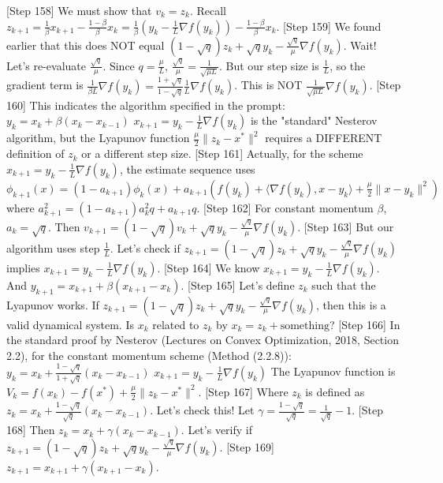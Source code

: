 \documentclass{article}
\begin{document}
[Step 158] We must show that $v_k = z_k$.
Recall $z_{k+1} = \frac{1}{\beta}x_{k+1} - \frac{1-\beta}{\beta}x_k = \frac{1}{\beta}(y_k - \frac{1}{L}\nabla f(y_k)) - \frac{1-\beta}{\beta}x_k$.
[Step 159] We found earlier that this does NOT equal $(1-\sqrt{q})z_k + \sqrt{q}y_k - \frac{\sqrt{q}}{\mu}\nabla f(y_k)$.
Wait! Let's re-evaluate $\frac{\sqrt{q}}{\mu}$. Since $q = \frac{\mu}{L}$, $\frac{\sqrt{q}}{\mu} = \frac{1}{\sqrt{\mu L}}$.
But our step size is $\frac{1}{L}$, so the gradient term is $\frac{1}{\beta L}\nabla f(y_k) = \frac{1+\sqrt{q}}{1-\sqrt{q}} \frac{1}{L} \nabla f(y_k)$.
This is NOT $\frac{1}{\sqrt{\mu L}}\nabla f(y_k)$.
[Step 160] This indicates the algorithm specified in the prompt:
$y_k = x_k + \beta(x_k - x_{k-1})$
$x_{k+1} = y_k - \frac{1}{L}\nabla f(y_k)$
is the "standard" Nesterov algorithm, but the Lyapunov function $\frac{\mu}{2}\|z_k - x^*\|^2$ requires a DIFFERENT definition of $z_k$ or a different step size.
[Step 161] Actually, for the scheme $x_{k+1} = y_k - \frac{1}{L}\nabla f(y_k)$, the estimate sequence uses $\phi_{k+1}(x) = (1-a_{k+1})\phi_k(x) + a_{k+1}(f(y_k) + \langle \nabla f(y_k), x - y_k \rangle + \frac{\mu}{2}\|x - y_k\|^2)$ where $a_{k+1}^2 = (1-a_{k+1})a_k^2 q + a_{k+1} q$.
[Step 162] For constant momentum $\beta$, $a_k = \sqrt{q}$.
Then $v_{k+1} = (1-\sqrt{q})v_k + \sqrt{q}y_k - \frac{\sqrt{q}}{\mu}\nabla f(y_k)$.
[Step 163] But our algorithm uses step $\frac{1}{L}$.
Let's check if $z_{k+1} = (1-\sqrt{q})z_k + \sqrt{q}y_k - \frac{\sqrt{q}}{\mu}\nabla f(y_k)$ implies $x_{k+1} = y_k - \frac{1}{L}\nabla f(y_k)$.
[Step 164] We know $x_{k+1} = y_k - \frac{1}{L}\nabla f(y_k)$.
And $y_{k+1} = x_{k+1} + \beta(x_{k+1} - x_k)$.
[Step 165] Let's define $z_k$ such that the Lyapunov works.
If $z_{k+1} = (1-\sqrt{q})z_k + \sqrt{q}y_k - \frac{\sqrt{q}}{\mu}\nabla f(y_k)$, then this is a valid dynamical system.
Is $x_k$ related to $z_k$ by $x_k = z_k + \text{something}$?
[Step 166] In the standard proof by Nesterov (Lectures on Convex Optimization, 2018, Section 2.2), for the constant momentum scheme (Method (2.2.8)):
$y_k = x_k + \frac{1-\sqrt{q}}{1+\sqrt{q}}(x_k - x_{k-1})$
$x_{k+1} = y_k - \frac{1}{L}\nabla f(y_k)$
The Lyapunov function is $V_k = f(x_k) - f(x^*) + \frac{\mu}{2}\|z_k - x^*\|^2$.
[Step 167] Where $z_k$ is defined as $z_k = x_k + \frac{1-\sqrt{q}}{\sqrt{q}}(x_k - x_{k-1})$.
Let's check this! Let $\gamma = \frac{1-\sqrt{q}}{\sqrt{q}} = \frac{1}{\sqrt{q}} - 1$.
[Step 168] Then $z_k = x_k + \gamma(x_k - x_{k-1})$.
Let's verify if $z_{k+1} = (1-\sqrt{q})z_k + \sqrt{q}y_k - \frac{\sqrt{q}}{\mu}\nabla f(y_k)$.
[Step 169] $z_{k+1} = x_{k+1} + \gamma(x_{k+1} - x_k)$.
\end{document}
